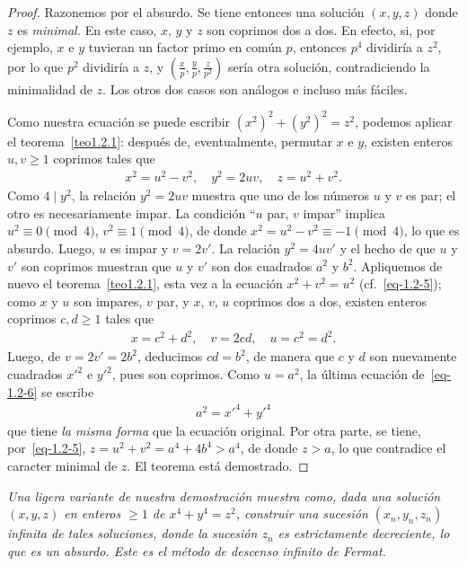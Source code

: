 \documentclass[oneside,bibtotoc,leqno,spanish]{amsbook}
\numberwithin{equation}{section}
\newenvironment{comm}%
	{\begin{trivlist}\item\small\itshape}
	{\end{trivlist}}
\theoremstyle{defi}
\theoremstyle{note}
\theoremstyle{rem}
\numberwithin{theorem}{section}
\numberwithin{proposition}{section}
\numberwithin{definition}{section}
\numberwithin{lemma}{section}
\numberwithin{corollary}{section}
\numberwithin{example}{section}
\numberwithin{footnote}{section}%
\begin{document}
\begin{proof}
Razonemos por el absurdo. Se tiene entonces una soluci\'on $(x,y,z)$ donde $z$ es {\em minimal.}
En este caso, $x$, $y$ y $z$ son coprimos dos a dos. En efecto, si, por ejemplo, $x$ e $y$ tuvieran
un factor primo en com\'un $p$, entonces $p^{4}$ dividir\'ia a $z^{2}$, por lo que $p^{2}$ dividir\'ia
a $z$, y $\left(\frac{x}{p},\frac{y}{p},\frac{z}{p^{2}}\right)$ ser\'ia otra soluci\'on, contradiciendo
la minimalidad de $z$. Los otros dos casos son an\'alogos e incluso m\'as f\'aciles.

Como nuestra
ecuaci\'on se puede escribir $(x^{2})^{2}+(y^{2})^{2}=z^{2}$, podemos aplicar el teorema~\ref{teo1.2.1}: despu\'es
de, eventualmente, permutar $x$ e $y$, existen enteros $u, v\geq 1$ coprimos tales que
\begin{gather}\label{eq-1.2-5}
x^{2} = u^{2}-v^{2},\quad y^{2} = 2uv,\quad z = u^{2}+v^{2}.
\end{gather}
Como $4\mid y^{2}$, la relaci\'on $y^{2} = 2uv$ muestra que uno de los n\'umeros $u$ y $v$ es
par; el otro es necesariamente impar. La condici\'on ``$u$ par, $v$ impar'' implica
$u^{2}\equiv 0\pmod 4$, $v^{2}\equiv 1\pmod 4$, de donde $x^{2}=u^{2}-v^{2}\equiv -1\pmod 4$,
lo que es absurdo. Luego, $u$ es impar y $v = 2v'$. La relaci\'on $y^{2} = 4uv'$ y el hecho
de que $u$ y $v'$ son coprimos muestran que $u$ y $v'$ son dos cuadrados $a^{2}$ y $b^{2}$.
Apliquemos de nuevo el teorema~\ref{teo1.2.1}, esta vez a la ecuaci\'on $x^{2}+v^{2} = u^{2}$ (cf.~\eqref{eq-1.2-5});
como $x$ y $u$ son impares, $v$ par, y $x$, $v$, $u$ coprimos dos a dos, existen enteros coprimos
$c,d\geq 1$ tales que
\begin{gather}\label{eq-1.2-6}
x = c^{2}+d^{2},\quad v = 2cd,\quad u=c^{2}=d^{2}.
\end{gather}
Luego, de $v = 2v' = 2b^{2}$, deducimos $cd = b^{2}$, de manera que $c$ y $d$ son nuevamente
cuadrados $x'^{2}$ e $y'^{2}$, pues son coprimos. Como $u=a^{2}$, la \'ultima ecuaci\'on de~\eqref{eq-1.2-6}
se escribe
\begin{gather}
a^{2} = x'^{4}+y'^{4}
\end{gather}
que tiene {\em la misma forma} que la ecuaci\'on original. Por otra parte, se tiene, por~\eqref{eq-1.2-5},
$z = u^{2}+v^{2} = a^{4}+4b^{4} > a^{4}$, de donde $z > a$, lo que contradice el caracter minimal
de $z$. El teorema est\'a demostrado.
\end{proof}

\begin{comm}
Una ligera variante de nuestra demostraci\'on muestra como, dada una soluci\'on $(x,y,z)$
en enteros $\geq 1$ de $x^{4}+y^{4}=z^{2}$, construir una sucesi\'on $(x_{n},y_{n},z_{n})$
infinita de tales soluciones, donde la sucesi\'on $z_{n}$ es estrictamente decreciente, lo
que es un absurdo. Este es el m\'etodo de {\em descenso infinito} de Fermat.
\end{comm}
\end{document}

